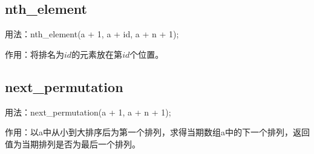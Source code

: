 \subsection{nth\_element}
	用法：nth\_element(a + 1, a + id, a + n + 1); \par
	作用：将排名为$id$的元素放在第$id$个位置。
\subsection{next\_permutation}
	用法：next\_permutation(a + 1, a + n + 1); \par
	作用：以a中从小到大排序后为第一个排列，求得当期数组a中的下一个排列，返回值为当期排列是否为最后一个排列。
